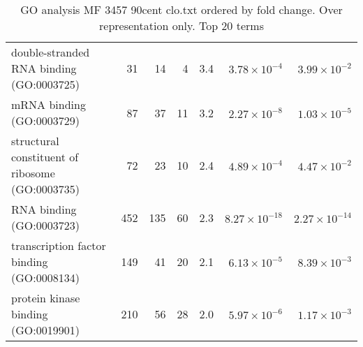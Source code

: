 \begin{table}[ht]
\begin{adjustbox}{width=\textwidth}
\begin{tabular}{lrrrrrr}
  double-stranded RNA binding (GO:0003725) & 31 & 14 & 4 & 3.4 & $3.78 \times 10^{-4}$ & $3.99 \times 10^{-2}$ \\ 
  mRNA binding (GO:0003729) & 87 & 37 & 11 & 3.2 & $2.27 \times 10^{-8}$ & $1.03 \times 10^{-5}$ \\ 
  structural constituent of ribosome (GO:0003735) & 72 & 23 & 10 & 2.4 & $4.89 \times 10^{-4}$ & $4.47 \times 10^{-2}$ \\ 
  RNA binding (GO:0003723) & 452 & 135 & 60 & 2.3 & $8.27 \times 10^{-18}$ & $2.27 \times 10^{-14}$ \\ 
  transcription factor binding (GO:0008134) & 149 & 41 & 20 & 2.1 & $6.13 \times 10^{-5}$ & $8.39 \times 10^{-3}$ \\ 
  protein kinase binding (GO:0019901) & 210 & 56 & 28 & 2.0 & $5.97 \times 10^{-6}$ & $1.17 \times 10^{-3}$ \\ 
   \hline
\end{tabular}
\end{adjustbox}
\caption{GO analysis MF 3457 90cent clo.txt ordered by fold change. Over representation only. Top 20 terms} 
\label{tab:GO analysis MF 3457 90cent clo.txt ordered by fold change. Over representation only. Top 20 terms}
\end{table}


